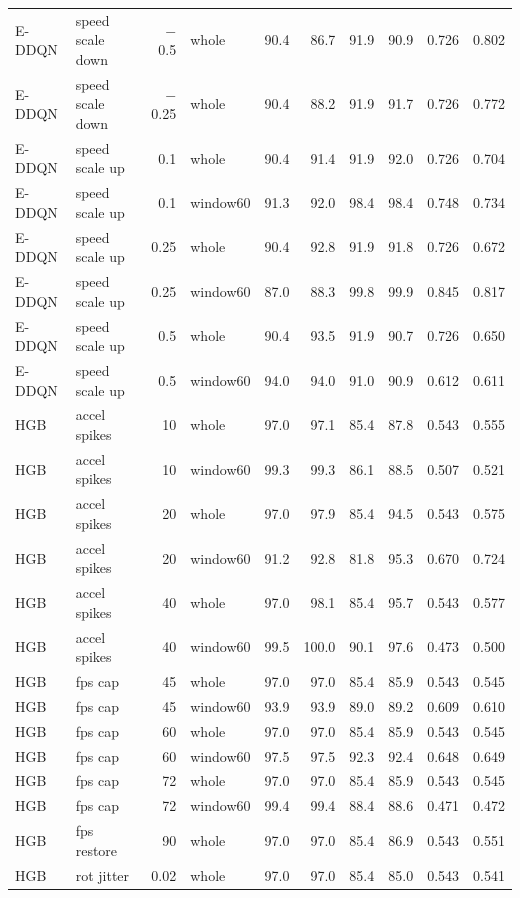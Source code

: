 \begin{longtable}{llrlrrrrrr}
E-DDQN & speed scale down & $-$0.5 & whole & 90.4 & 86.7 & 91.9 & 90.9 & 0.726 & 0.802 \\
E-DDQN & speed scale down & $-$0.25 & whole & 90.4 & 88.2 & 91.9 & 91.7 & 0.726 & 0.772 \\
E-DDQN & speed scale up & 0.1 & whole & 90.4 & 91.4 & 91.9 & 92.0 & 0.726 & 0.704 \\
E-DDQN & speed scale up & 0.1 & window60 & 91.3 & 92.0 & 98.4 & 98.4 & 0.748 & 0.734 \\
E-DDQN & speed scale up & 0.25 & whole & 90.4 & 92.8 & 91.9 & 91.8 & 0.726 & 0.672 \\
E-DDQN & speed scale up & 0.25 & window60 & 87.0 & 88.3 & 99.8 & 99.9 & 0.845 & 0.817 \\
E-DDQN & speed scale up & 0.5 & whole & 90.4 & 93.5 & 91.9 & 90.7 & 0.726 & 0.650 \\
E-DDQN & speed scale up & 0.5 & window60 & 94.0 & 94.0 & 91.0 & 90.9 & 0.612 & 0.611 \\
HGB & accel spikes & 10 & whole & 97.0 & 97.1 & 85.4 & 87.8 & 0.543 & 0.555 \\
HGB & accel spikes & 10 & window60 & 99.3 & 99.3 & 86.1 & 88.5 & 0.507 & 0.521 \\
HGB & accel spikes & 20 & whole & 97.0 & 97.9 & 85.4 & 94.5 & 0.543 & 0.575 \\
HGB & accel spikes & 20 & window60 & 91.2 & 92.8 & 81.8 & 95.3 & 0.670 & 0.724 \\
HGB & accel spikes & 40 & whole & 97.0 & 98.1 & 85.4 & 95.7 & 0.543 & 0.577 \\
HGB & accel spikes & 40 & window60 & 99.5 & 100.0 & 90.1 & 97.6 & 0.473 & 0.500 \\
HGB & fps cap & 45 & whole & 97.0 & 97.0 & 85.4 & 85.9 & 0.543 & 0.545 \\
HGB & fps cap & 45 & window60 & 93.9 & 93.9 & 89.0 & 89.2 & 0.609 & 0.610 \\
HGB & fps cap & 60 & whole & 97.0 & 97.0 & 85.4 & 85.9 & 0.543 & 0.545 \\
HGB & fps cap & 60 & window60 & 97.5 & 97.5 & 92.3 & 92.4 & 0.648 & 0.649 \\
HGB & fps cap & 72 & whole & 97.0 & 97.0 & 85.4 & 85.9 & 0.543 & 0.545 \\
HGB & fps cap & 72 & window60 & 99.4 & 99.4 & 88.4 & 88.6 & 0.471 & 0.472 \\
HGB & fps restore & 90 & whole & 97.0 & 97.0 & 85.4 & 86.9 & 0.543 & 0.551 \\
HGB & rot jitter & 0.02 & whole & 97.0 & 97.0 & 85.4 & 85.0 & 0.543 & 0.541 \\

\end{longtable}
